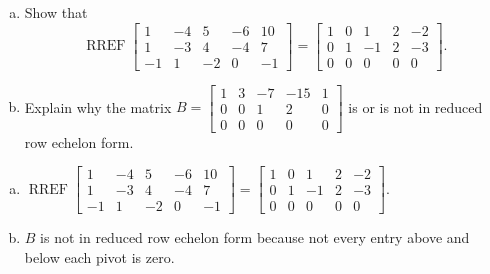 
\begin{exerciseStatement}

\begin{enumerate}[(a)]
\item Show that \[\operatorname{RREF} \left[\begin{array}{ccccc}
1 & -4 & 5 & -6 & 10 \\
1 & -3 & 4 & -4 & 7 \\
-1 & 1 & -2 & 0 & -1
\end{array}\right] = \left[\begin{array}{ccccc}
1 & 0 & 1 & 2 & -2 \\
0 & 1 & -1 & 2 & -3 \\
0 & 0 & 0 & 0 & 0
\end{array}\right] .\]
\item Explain why the matrix \(B= \left[\begin{array}{ccccc}
1 & 3 & -7 & -15 & 1 \\
0 & 0 & 1 & 2 & 0 \\
0 & 0 & 0 & 0 & 0
\end{array}\right] \) is or is not in reduced row echelon form.
\end{enumerate}
    
\end{exerciseStatement}
    
\begin{exerciseAnswer} 

\begin{enumerate}[(a)]
\item \(\operatorname{RREF} \left[\begin{array}{ccccc}
1 & -4 & 5 & -6 & 10 \\
1 & -3 & 4 & -4 & 7 \\
-1 & 1 & -2 & 0 & -1
\end{array}\right] = \left[\begin{array}{ccccc}
1 & 0 & 1 & 2 & -2 \\
0 & 1 & -1 & 2 & -3 \\
0 & 0 & 0 & 0 & 0
\end{array}\right] .\)
\item \(B\) is not in reduced row echelon form because not every entry above and below each pivot is zero. 
\end{enumerate}
    
\end{exerciseAnswer}
    
